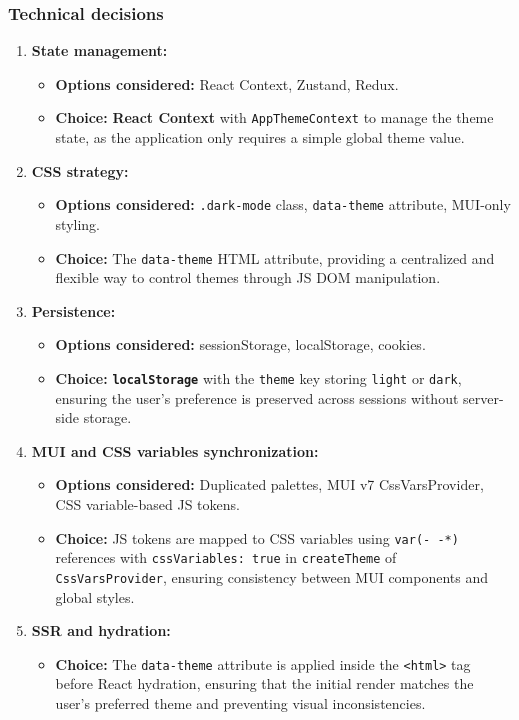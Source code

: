 \subsubsection{Technical decisions}

\begin{enumerate}
    \item \textbf{State management:}
    \begin{itemize}
        \item \textbf{Options considered:} React Context, Zustand, Redux.
        \item \textbf{Choice:} \textbf{React Context} with \texttt{AppThemeContext} to manage the theme state, as the application only requires a simple global theme value.
    \end{itemize}

    \item \textbf{CSS strategy:}
    \begin{itemize}
        \item \textbf{Options considered:} \texttt{.dark-mode} class, \texttt{data-theme} attribute, MUI-only styling.
        \item \textbf{Choice:} The \texttt{data-theme} \acs{HTML} attribute, providing a centralized and flexible way to control themes through \acs{JS} \acs{DOM} manipulation.
    \end{itemize}

    \item \textbf{Persistence:}
    \begin{itemize}
        \item \textbf{Options considered:} sessionStorage, localStorage, cookies.
        \item \textbf{Choice:} \textbf{\texttt{localStorage}} with the \texttt{theme} key storing \texttt{light} or \texttt{dark}, ensuring the user's preference is preserved across sessions without server-side storage.
    \end{itemize}

    \item \textbf{MUI and CSS variables synchronization:}
    \begin{itemize}
        \item \textbf{Options considered:} Duplicated palettes, MUI v7 CssVarsProvider, CSS variable-based JS tokens.
        \item \textbf{Choice:} \ac{JS} tokens are mapped to CSS variables using \texttt{var(- -*)} references with \texttt{cssVariables: true} in \texttt{createTheme} of \texttt{CssVarsProvider}, ensuring consistency between MUI components and global styles.
    \end{itemize}

    \item \textbf{SSR and hydration:}
    \begin{itemize}
        \item \textbf{Choice:} The \texttt{data-theme} attribute is applied inside the \texttt{<html>} tag before React hydration, ensuring that the initial render matches the user's preferred theme and preventing visual inconsistencies.
    \end{itemize}
\end{enumerate}

